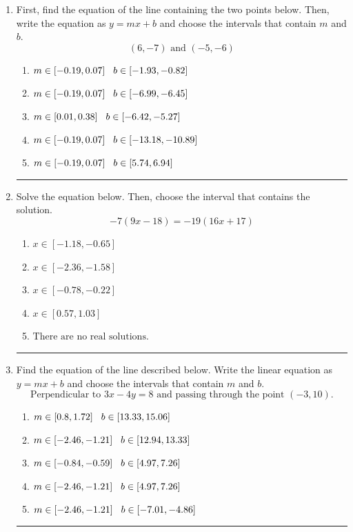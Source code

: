 \documentclass[14pt]{extbook}
\newcommand{\litem}[1]{\item#1\hspace*{-1cm}\rule{\textwidth}{0.4pt}}
\begin{document}
\begin{enumerate}
{\begin{enumerate}[label=\Alph*.]
\end{enumerate} }
\litem{
First, find the equation of the line containing the two points below. Then, write the equation as $ y=mx+b $ and choose the intervals that contain $m$ and $b$.\[ (6, -7) \text{ and } (-5, -6) \]\begin{enumerate}[label=\Alph*.]
\item \( m \in [-0.19, 0.07] \hspace*{3mm} b \in [-1.93, -0.82] \)
\item \( m \in [-0.19, 0.07] \hspace*{3mm} b \in [-6.99, -6.45] \)
\item \( m \in [0.01, 0.38] \hspace*{3mm} b \in [-6.42, -5.27] \)
\item \( m \in [-0.19, 0.07] \hspace*{3mm} b \in [-13.18, -10.89] \)
\item \( m \in [-0.19, 0.07] \hspace*{3mm} b \in [5.74, 6.94] \)

\end{enumerate} }
\litem{
Solve the equation below. Then, choose the interval that contains the solution.\[ -7(9x -18) = -19(16x + 17) \]\begin{enumerate}[label=\Alph*.]
\item \( x \in [-1.18, -0.65] \)
\item \( x \in [-2.36, -1.58] \)
\item \( x \in [-0.78, -0.22] \)
\item \( x \in [0.57, 1.03] \)
\item \( \text{There are no real solutions.} \)

\end{enumerate} }
\litem{
Find the equation of the line described below. Write the linear equation as $ y=mx+b $ and choose the intervals that contain $m$ and $b$.\[ \text{Perpendicular to } 3 x - 4 y = 8 \text{ and passing through the point } (-3, 10). \]\begin{enumerate}[label=\Alph*.]
\item \( m \in [0.8, 1.72] \hspace*{3mm} b \in [13.33, 15.06] \)
\item \( m \in [-2.46, -1.21] \hspace*{3mm} b \in [12.94, 13.33] \)
\item \( m \in [-0.84, -0.59] \hspace*{3mm} b \in [4.97, 7.26] \)
\item \( m \in [-2.46, -1.21] \hspace*{3mm} b \in [4.97, 7.26] \)
\item \( m \in [-2.46, -1.21] \hspace*{3mm} b \in [-7.01, -4.86] \)

\end{enumerate} }
\end{enumerate}
\end{document}
